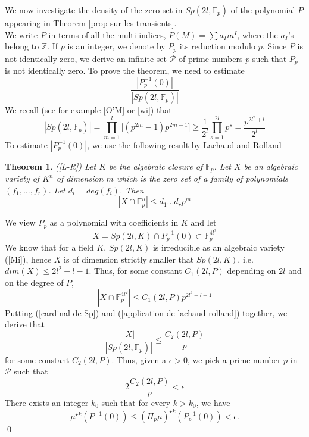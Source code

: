 \documentclass[10pt,a4paper]{amsart}
\newtheorem{thm}{Theorem}
\newcounter{constant}
\begin{document}
We now investigate the density of the zero set in $Sp(2l, \mathbb{F}_p)$ of the polynomial  $P$ appearing in Theorem \ref{prop sur les transients}.\\
We write $P$ in terms of all the multi-indices, $P(M)=\sum a_I m^I$, where the $a_I$'s belong to $\mathbb{Z}$. If $p$ is an integer, we denote by $P_p$ its reduction modulo $p$. Since $P$ is not identically zero, we derive an infinite set $\mathcal P$ of prime numbers $p$ such that $P_p$ is not identically zero.  To prove the theorem, we need to estimate
\begin{equation}
\frac{|P_p^{-1}(0)|}{|Sp(2l, \mathbb{F}_p)|}
\end{equation}
We recall (see for example [O'M] or [wi]) that 
\begin{equation}\label{cardinal de Sp}
|Sp(2l,\mathbb{F}_p)|=\prod_{m=1}^l\big[(p^{2m}-1)p^{2m-1}\big]\geq \frac{1}{2^{l}}\prod_{s=1}^{2l}p^{s}
= \dfrac{p^{2l^2+l}}{2^{l}}
\end{equation}
To estimate $|P_p^{-1}(0)|$, we use the following result by Lachaud and Rolland 
\begin{thm}
	([L-R]) Let $K$ be the algebraic closure of $\mathbb{F}_p$. Let $X$ be an algebraic variety of $K^n$ of dimension $m$ which is the zero set of a family of polynomials $(f_1,...,f_r)$. Let $d_i=deg(f_i)$. Then 
	$$|X\cap \mathbb{F}_p^n|\leq d_1...d_rp^m$$
\end{thm}
We view $P_p$ as a polynomial with coefficients in $K$ and let 
\begin{equation}
X=Sp(2l,K)\cap P_p^{-1}(0)\subset \mathbb{F}_p^{4l^2}
\end{equation} We know that for a field $K$, $Sp(2l,K)$ is irreducible as an algebraic variety ([Mi]), hence $X$ is of dimension strictly smaller that $Sp(2l,K)$, i.e. $dim(X)\leq 2l^2+l-1$.  Thus, for some constant $C_1(2l,P)$ depending on $2l$ and on the degree of $P$,
\begin{equation}\label{application de lachaud-rolland}
|X\cap \mathbb{F}_p^{4l^2}|\leq C_1(2l,P) p^{2l^2+l-1}
\end{equation} 
Putting (\ref{cardinal de Sp}) and (\ref{application de lachaud-rolland}) together, we derive that  
\begin{equation}\label{estimee de conclusion}
\dfrac{|X|}{|Sp(2l, \mathbb{F}_p)|}\leq \dfrac{C_2(2l,P)}{p}
\end{equation}
for some constant $C_2(2l,P)$. Thus, given a $\epsilon>0$, we pick a prime number $p$ in $\mathcal P$ such that 
\begin{equation}
2\dfrac{C_2(2l,P)}{p}<\epsilon
\end{equation}
There exists an integer $k_0$ such that for every $k>k_0$, we have $$\mu^{\star k}(P^{-1}(0))\leq (\Pi_p\mu)^{\star k}(P_p^{-1}(0))<\epsilon.$$ 
\qed
\end{document}

